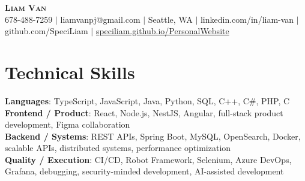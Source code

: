 \documentclass[letterpaper,11pt]{article}
\begin{document}

%
\begin{center}
    \textbf{\Huge \scshape Liam Van} \\ \vspace{1pt}
    \small 678-488-7259 $|$ \small {liamvanpj@gmail.com} $|$ Seattle, WA
 {{$|$ linkedin.com/in/liam-van} {$|$ github.com/SpeciLiam} {$|$ \href{https://speciliam.github.io/PersonalWebsite}{speciliam.github.io/PersonalWebsite}}}

\end{center}

\section{Technical Skills}
 \begin{itemize}[leftmargin=0.15in, label={}]
    \small{\item{
     \textbf{Languages}{: TypeScript, JavaScript, Java, Python, SQL, C++, C\#, PHP, C} \\
     \textbf{Frontend / Product}{: React, Node.js, NestJS, Angular, full-stack product development, Figma collaboration} \\
     \textbf{Backend / Systems}{: REST APIs, Spring Boot, MySQL, OpenSearch, Docker, scalable APIs, distributed systems, performance optimization} \\
     \textbf{Quality / Execution}{: CI/CD, Robot Framework, Selenium, Azure DevOps, Grafana, debugging, security-minded development, AI-assisted development} \\
    }}
 \end{itemize}
%
\end{document}
